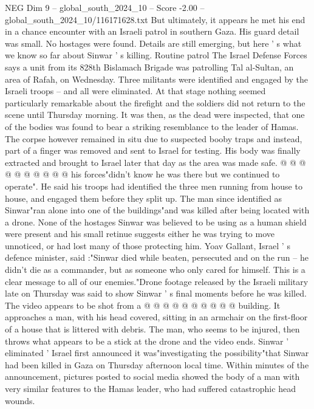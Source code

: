\begin{textsample}{NEG Dim 9 – global\_south\_2024\_10 – Score -2.00 – global\_south\_2024\_10/116171628.txt}  \label{ex:f9_neg_373}
But ultimately, it appears he met his end in a chance encounter with an Israeli patrol in southern Gaza.
His guard detail was small.
No hostages were found.
Details are still emerging, but here ' s what we know so far about Sinwar ' s killing.
Routine patrol The Israel Defense Forces says a unit from its 828th Bislamach Brigade was patrolling Tal al-Sultan, an area of Rafah, on Wednesday.
Three militants were identified and engaged by the Israeli troops -- and all were eliminated.
At that stage nothing seemed particularly remarkable about the firefight and the soldiers did not return to the scene until Thursday morning.
It was then, as the dead were inspected, that one of the bodies was found to bear a striking resemblance to the leader of Hamas.
The corpse however remained in situ due to suspected booby traps and instead, part of a finger was removed and sent to Israel for testing.
His body was finally extracted and brought to Israel later that day as the area was made safe. @ @ @ @ @ @ @ @ @ @ his forces"didn't know he was there but we continued to operate".
He said his troops had identified the three men running from house to house, and engaged them before they split up.
The man since identified as Sinwar"ran alone into one of the buildings"and was killed after being located with a drone.
None of the hostages Sinwar was believed to be using as a human shield were present and his small retinue suggests either he was trying to move unnoticed, or had lost many of those protecting him.
Yoav Gallant, Israel ' s defence minister, said :"Sinwar died while beaten, persecuted and on the run -- he didn't die as a commander, but as someone who only cared for himself.
This is a clear message to all of our enemies."Drone footage released by the Israeli military late on Thursday was said to show Sinwar ' s final moments before he was killed.
The video appears to be shot from a @ @ @ @ @ @ @ @ @ @ building.
It approaches a man, with his head covered, sitting in an armchair on the first-floor of a house that is littered with debris.
The man, who seems to be injured, then throws what appears to be a stick at the drone and the video ends.
Sinwar ' eliminated ' Israel first announced it was"investigating the possibility"that Sinwar had been killed in Gaza on Thursday afternoon local time.
Within minutes of the announcement, pictures posted to social media showed the body of a man with very similar features to the Hamas leader, who had suffered catastrophic head wounds.

\end{textsample}
